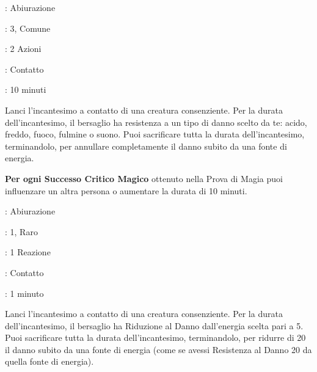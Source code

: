 \begin{multicols}{2}
\noindent\colorbox{OBSSgold!10}{
\begin{minipage}{0.95\linewidth}
\begin{description}[noitemsep, topsep=0pt, parsep=0pt, partopsep=0pt, leftmargin=0cm, labelwidth=1.3cm]
	\item[\textbf{Lista}]: Abiurazione
	\item[\textbf{Livello}]: 3, Comune
	\item[\textbf{Lancio}]: 2 Azioni
	\item[\textbf{Gittata}]: Contatto
	\item[\textbf{Durata}]: 10 minuti
\end{description}
\end{minipage}}\smallskip

Lanci l'incantesimo a contatto di una creatura consenziente. Per la durata dell'incantesimo, il bersaglio ha resistenza a un tipo di danno scelto da te: acido, freddo, fuoco, fulmine o suono. Puoi sacrificare tutta la durata dell'incantesimo, terminandolo, per annullare completamente il danno subito da una fonte di energia.

\textbf{Per ogni Successo Critico Magico} ottenuto nella Prova di Magia puoi influenzare un altra persona o aumentare la durata di 10 minuti.

\noindent\colorbox{OBSSgold!10}{
\begin{minipage}{0.95\linewidth}
\begin{description}[noitemsep, topsep=0pt, parsep=0pt, partopsep=0pt, leftmargin=0cm, labelwidth=1.3cm]
	\item[\textbf{Lista}]: Abiurazione
	\item[\textbf{Livello}]: 1, Raro
	\item[\textbf{Lancio}]: 1 Reazione
	\item[\textbf{Gittata}]: Contatto
	\item[\textbf{Durata}]: 1 minuto
\end{description}
\end{minipage}}\smallskip

Lanci l'incantesimo a contatto di una creatura consenziente. Per la durata dell'incantesimo, il bersaglio ha Riduzione al Danno dall'energia scelta pari a 5. Puoi sacrificare tutta la durata dell'incantesimo, terminandolo, per ridurre di 20 il danno subito da una fonte di energia (come se avessi Resistenza al Danno 20 da quella fonte di energia).


\end{multicols}
